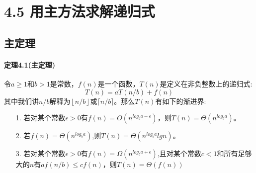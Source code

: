 \documentclass[a4paper,11pt]{article}
\newcommand{\floor}[1]{\left\lfloor #1 \right\rfloor}
\newcommand{\ceiling}[1]{\lceil #1 \rceil}
\begin{document}
\section*{4.5 用主方法求解递归式}
\subsection*{主定理}
\paragraph*{定理4.1(主定理)}令$a\geq 1$和$b>1$是常数，$f(n)$是一个函数，$T(n)$是定义在非负整数上的递归式:
\[
	T(n) = aT(n/b)+f(n)
\]
其中我们讲$n/b$解释为$\floor{n/b}$或$\ceiling{n/b}$。那么$T(n)$有如下的渐进界:
\begin{itemize}
	\item[1.]
		若对某个常数$\epsilon>0$有$f(n)=O(n^{log_b{a}-\epsilon})$，则$T(n)=\Theta(n^{log_b{a}})$。
	\item[2.]
		若$f(n)=\Theta(n^{log_b{a}})$,则$T(n)=\Theta(n^{log_b{a}}lgn)$。
	\item[3.]
		若对某个常数$\epsilon>0$有$f(n)=\Omega(n^{log_b{a}+\epsilon})$,且对某个常数$c<1$和所有足够大的$n$有$af(n/b)\leq cf(n)$，则$T(n)=\Theta(f(n))$
\end{itemize}		
\end{document}
